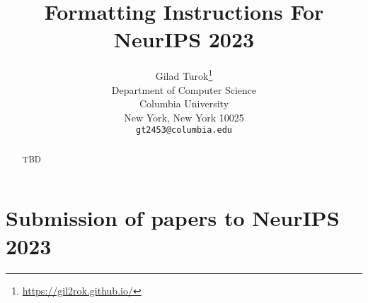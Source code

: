 \documentclass{article}
\title{Formatting Instructions For NeurIPS 2023}
\author{%
  Gilad Turok\thanks{\url{https://gil2rok.github.io/}} \\
  Department of Computer Science\\
  Columbia University\\
  New York, New York 10025 \\
  \texttt{gt2453@columbia.edu} \\
}
\begin{document}
\maketitle


\begin{abstract}
  TBD
\end{abstract}


\section{Submission of papers to NeurIPS 2023}



\end{document}
